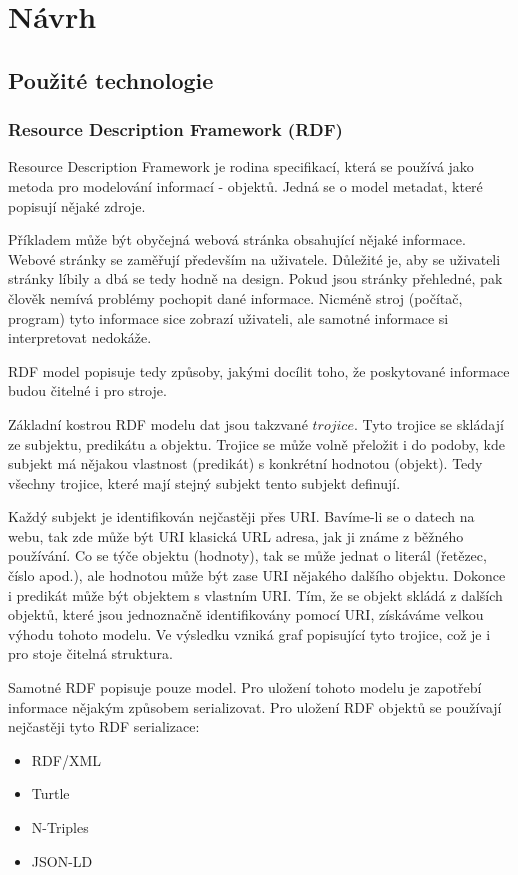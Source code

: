 \documentclass[thesis=B,czech]{FITthesis}[2012/06/26]
\begin{document}
 \chapter{Návrh}
 
 \section{Použité technologie}
 
 \subsection{Resource Description Framework (RDF)}
 Resource Description Framework je rodina specifikací, která se používá jako metoda pro modelování informací - objektů.
 Jedná se o model metadat, které popisují nějaké zdroje.
 
 Příkladem může být obyčejná webová stránka obsahující nějaké informace. Webové stránky se zaměřují především na uživatele.
 Důležité je, aby se uživateli stránky líbily a dbá se tedy hodně na design. Pokud jsou stránky přehledné, pak člověk nemívá problémy pochopit
 dané informace. Nicméně stroj (počítač, program) tyto informace sice zobrazí uživateli, ale samotné informace si interpretovat nedokáže.
 
 RDF model popisuje tedy způsoby, jakými docílit toho, že poskytované informace budou čitelné i pro stroje.
 
 Základní kostrou RDF modelu dat jsou takzvané $trojice$. Tyto trojice se skládají ze subjektu, predikátu a objektu.
 Trojice se může volně přeložit i do podoby, kde subjekt má nějakou vlastnost (predikát) s konkrétní hodnotou (objekt). Tedy všechny trojice, které mají
 stejný subjekt tento subjekt definují.
 
 Každý subjekt je identifikován nejčastěji přes URI. Bavíme-li se o datech na webu, tak zde může být URI klasická URL adresa, jak ji známe
 z běžného používání. Co se týče objektu (hodnoty), tak se může jednat o literál (řetězec, číslo apod.), ale hodnotou může být zase URI nějakého dalšího objektu.
 Dokonce i predikát může být objektem s vlastním URI. Tím, že se objekt skládá z dalších objektů, které jsou jednoznačně identifikovány pomocí URI, získáváme velkou výhodu
 tohoto modelu. Ve výsledku vzniká graf popisující tyto trojice, což je i pro stoje čitelná struktura.
 
 Samotné RDF popisuje pouze model. Pro uložení tohoto modelu je zapotřebí informace nějakým způsobem serializovat. Pro uložení RDF objektů se 
 používají nejčastěji tyto RDF serializace:
 \begin{itemize}
  \item RDF/XML
  \item Turtle
  \item N-Triples
  \item JSON-LD
 \end{itemize}
 
\end{document}
